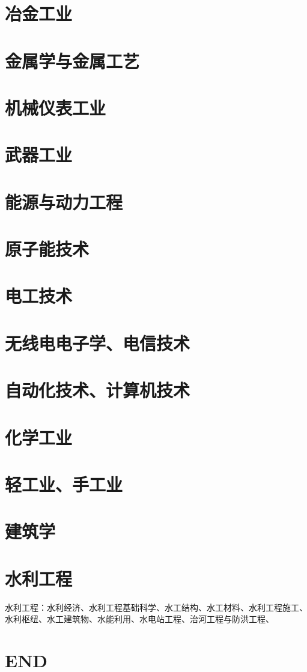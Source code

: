 \documentclass[UTF8]{../ApplicationUniverse}
\begin{document}
\chapter{冶金工业}%
\chapter{金属学与金属工艺}%
\chapter{机械仪表工业}%
\chapter{武器工业}%
\chapter{能源与动力工程}%
\chapter{原子能技术}%
\chapter{电工技术}%
\chapter{无线电电子学、电信技术}%
\chapter{自动化技术、计算机技术}%
\chapter{化学工业}%
\chapter{轻工业、手工业}%


\chapter{建筑学}%


\chapter{水利工程}%
水利工程：水利经济、水利工程基础科学、水工结构、水工材料、水利工程施工、水利枢纽、水工建筑物、水能利用、水电站工程、治河工程与防洪工程、










\chapter{END}
\end{document}
